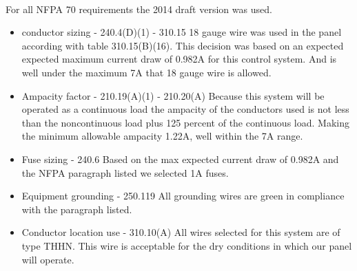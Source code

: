 \paragraph{} For all NFPA 70 requirements the 2014 draft version was used.

\begin{itemize}
	\item conductor sizing - 240.4(D)(1) - 310.15 {\newline} {\indent}
	      18 gauge wire was used in the panel according with table 310.15(B)(16).
	      This decision was based on an  expected expected maximum current draw of 0.982A for this control system.
	      And is well under the maximum 7A that 18 gauge wire is allowed.
	\item Ampacity factor - 210.19(A)(1) - 210.20(A) {\newline} {\indent}
	      Because this system will be operated as a continuous load the ampacity of the conductors used is not less
	      than the noncontinuous load plus 125 percent of the continuous load. Making the minimum allowable ampacity
	      1.22A, well within the 7A range.
	\item Fuse sizing - 240.6 {\newline} {\indent}
	      Based on the max expected current draw of 0.982A and the NFPA paragraph listed we selected 1A fuses.
	\item Equipment grounding - 250.119 {\newline} {\indent}
	      All grounding wires are green in compliance with the paragraph listed.
	\item Conductor location use - 310.10(A) {\newline} {\indent}
	      All wires selected for this system are of type THHN. This wire is acceptable for the dry conditions in which
	      our panel will operate.
\end{itemize}
